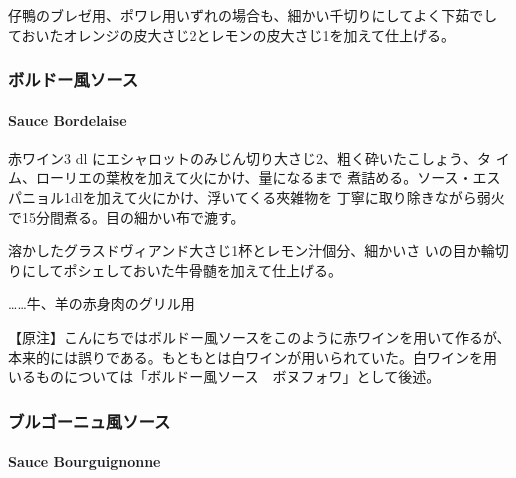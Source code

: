 仔鴨のブレゼ用、ポワレ用いずれの場合も、細かい千切りにしてよく下茹でし
ておいたオレンジの皮大さじ2とレモンの皮大さじ1を加えて仕上げる。

\maeaki

\hypertarget{ux30dcux30ebux30c9ux30fcux98a8ux30bdux30fcux30b9}{%
\subsubsection{ボルドー風ソース}\label{ux30dcux30ebux30c9ux30fcux98a8ux30bdux30fcux30b9}}

\hypertarget{sauce-bordelaise}{%
\paragraph{Sauce Bordelaise}\label{sauce-bordelaise}}

   

赤ワイン3 dl にエシャロットのみじん切り大さじ2、粗く砕いたこしょう、タ
イム、ローリエの葉\undemi{}枚を加えて火にかけ、\unquart{}量になるまで
煮詰める。ソース・エスパニョル1dlを加えて火にかけ、浮いてくる夾雑物を
丁寧に取り除きながら弱火で15分間煮る。目の細かい布で漉す。

溶かしたグラスドヴィアンド大さじ1杯とレモン汁\unquart{}個分、細かいさ
いの目か輪切りにしてポシェしておいた牛骨髄を加えて仕上げる。

\ldots{}\ldots{}牛、羊の赤身肉のグリル用

【原注】こんにちではボルドー風ソースをこのように赤ワインを用いて作るが、
本来的には誤りである。もともとは白ワインが用いられていた。白ワインを用
いるものについては「ボルドー風ソース　ボヌフォワ」として後述。

\maeaki

\hypertarget{ux30d6ux30ebux30b4ux30fcux30cbux30e5ux98a8ux30bdux30fcux30b9}{%
\subsubsection{ブルゴーニュ風ソース}\label{ux30d6ux30ebux30b4ux30fcux30cbux30e5ux98a8ux30bdux30fcux30b9}}

\hypertarget{sauce-bourguignonne}{%
\paragraph{Sauce Bourguignonne}\label{sauce-bourguignonne}}

